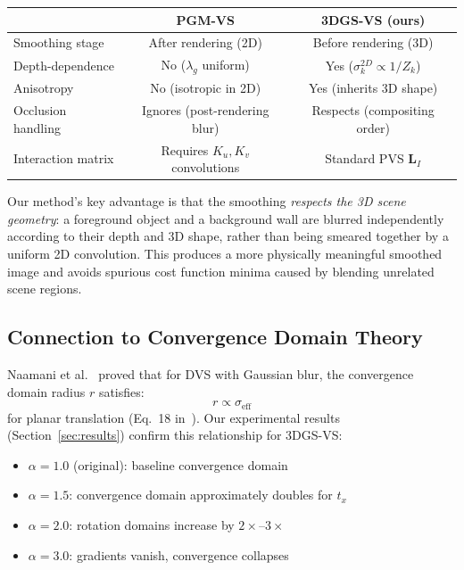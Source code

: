 \documentclass[11pt]{article}
\begin{document}
\begin{center}
\renewcommand{\arraystretch}{1.3}
\begin{tabular}{lcc}
\toprule
 & \textbf{PGM-VS} & \textbf{3DGS-VS (ours)} \\
\midrule
Smoothing stage & After rendering (2D) & Before rendering (3D) \\
Depth-dependence & No ($\lambda_g$ uniform) & Yes ($\sigma_k^{2D} \propto 1/Z_k$) \\
Anisotropy & No (isotropic in 2D) & Yes (inherits 3D shape) \\
Occlusion handling & Ignores (post-rendering blur) & Respects (compositing order) \\
Interaction matrix & Requires $K_u, K_v$ convolutions & Standard PVS $\mathbf{L}_I$ \\
\bottomrule
\end{tabular}
\end{center}

Our method's key advantage is that the smoothing \emph{respects the 3D scene geometry}: a foreground object and a background wall are blurred independently according to their depth and 3D shape, rather than being smeared together by a uniform 2D convolution. This produces a more physically meaningful smoothed image and avoids spurious cost function minima caused by blending unrelated scene regions.

\subsection{Connection to Convergence Domain Theory}

Naamani et al.~\cite{naamani2024iros} proved that for DVS with Gaussian blur, the convergence domain radius $r$ satisfies:
\begin{equation}
    r \propto \sigma_{\text{eff}}
\end{equation}
for planar translation (Eq.~18 in~\cite{naamani2024iros}). Our experimental results (Section~\ref{sec:results}) confirm this relationship for 3DGS-VS:
\begin{itemize}
    \item $\alpha = 1.0$ (original): baseline convergence domain
    \item $\alpha = 1.5$: convergence domain approximately doubles for $t_x$
    \item $\alpha = 2.0$: rotation domains increase by $2\times$--$3\times$
    \item $\alpha = 3.0$: gradients vanish, convergence collapses
\end{itemize}
\end{document}

